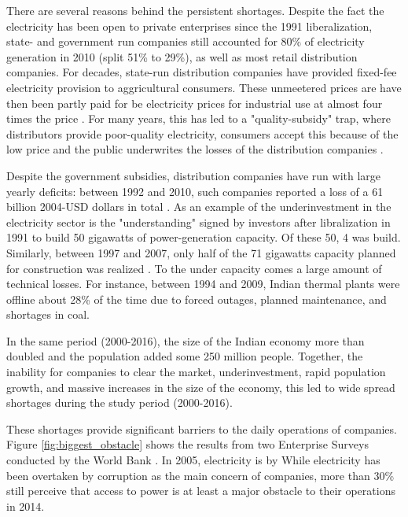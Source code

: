 \documentclass[11pt]{article}
\begin{document}
There are several reasons behind the persistent shortages. Despite the fact the electricity has been open to private enterprises since the 1991 liberalization, state- and government run companies still accounted for 80\% of electricity generation in 2010 (split 51\% to 29\%), as well as most retail distribution companies. For decades, state-run distribution companies have provided fixed-fee electricity provision to aggricultural consumers. These unmeetered prices are have then been partly paid for be electricity prices for industrial use at almost four times the price \citep{allcott_how_2016}. For many years, this has led to a "quality-subsidy" trap, where distributors provide poor-quality electricity, consumers accept this because of the low price and the public underwrites the losses of the distribution companies \citep{mcrae_infrastructure_2015}. 

Despite the government subsidies, distribution companies have run with large yearly deficits: between 1992 and 2010, such companies reported a loss of a 61 billion 2004-USD dollars in total \citep{allcott_how_2016}. As an example of the underinvestment in the electricity sector is the "understanding" signed by investors after libralization in 1991 to build 50 gigawatts of power-generation capacity. Of these 50, 4 was build. Similarly, between 1997 and 2007, only half of the 71 gigawatts capacity planned for construction was realized \citep{cea_planwise_2013}. To the under capacity comes a large amount of technical losses. For instance, between 1994 and 2009, Indian thermal plants were offline about 28\% of the time due to forced outages, planned maintenance, and shortages in coal. 

In the same period (2000-2016), the size of the Indian economy more than doubled and the population added some 250 million people. Together, the inability for companies to clear the market, underinvestment, rapid population growth, and massive increases in the size of the economy, this led to wide spread shortages during the study period (2000-2016). 

These shortages provide significant barriers to the daily operations of companies. Figure \ref{fig:biggest_obstacle} shows the results from two Enterprise Surveys conducted by the World Bank \citep{world_bank_enterprise_2020-1,world_bank_enterprise_2020-2}. In 2005, electricity is by  While electricity has been overtaken by corruption as the main concern of companies, more than 30\% still perceive that access to power is at least a major obstacle to their operations in 2014.
\end{document}
